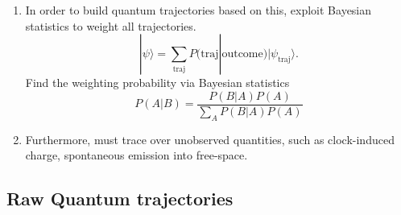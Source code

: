 \begin{enumerate}
  \item In order to build quantum trajectories based on this, exploit Bayesian statistics
    to weight all trajectories.  
    \begin{equation}
      |\psi\rangle = \sum_{\text{traj}} P(\text{traj}|\text{outcome})|\psi_{\text{traj}}\rangle.
    \end{equation}
    Find the weighting probability via Bayesian statistics
    \begin{equation}
      P(A|B) = \frac{P(B|A)P(A)}{\sum_AP(B|A)P(A)}
    \end{equation}
  \item Furthermore, must trace over unobserved quantities, such as clock-induced 
    charge, spontaneous emission into free-space.  
\end{enumerate}


\subsection{Raw Quantum trajectories}



